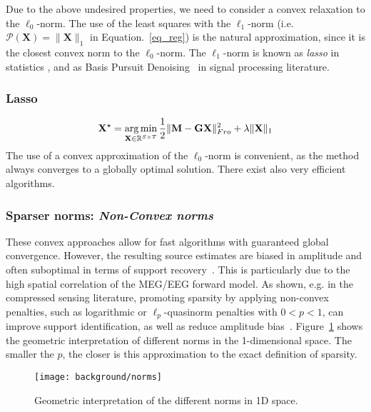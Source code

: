 Due to the above undesired properties, we need to consider a convex relaxation to the $\ell_0$-norm. The use of the least squares with the $\ell_1$-norm (i.e. $\mathcal{P}(\mathbf{X})=\|\mathbf{X}\|_1$ in Equation.~\eqref{eq_reg}) is the natural approximation, since it is the closest convex norm to the $\ell_0$-norm. The $\ell_1$-norm is known as \textit{lasso} in statistics \cite{tibshirani1996regression}, and as Basis Pursuit Denoising~\cite{chen2001atomic} in signal processing literature.

\adjustwidth{1em}{0pt}
\subsubsection*{Lasso}
\begin{equation} \label{eq_lasso}
	\mathbf{X}^\star = \mathop{\mathrm{arg}\,\mathrm{min}}_{\mathbf{X}\in\mathbb{R}^{S\times T}}\frac{1}{2}\|\mathbf{M}-\mathbf{GX}\|_{Fro}^2 + \lambda\|\mathbf{X}\|_1
\end{equation}
\endadjustwidth
The use of a convex approximation of the $\ell_0$-norm is convenient, as the method always converges to a globally optimal solution. There exist also very efficient algorithms.

\subsubsection*{Sparser norms: \textit{Non-Convex norms}}
These convex approaches allow for fast algorithms with guaranteed global convergence. However, the resulting source estimates are biased in amplitude and often suboptimal in terms of support recovery~\cite{candes2008enhancing}. This is particularly due to the high spatial correlation of the MEG/EEG forward model. As shown, e.g. in the compressed sensing literature, promoting sparsity by applying non-convex penalties, such as logarithmic or $\ell_p$-quasinorm penalties with $0 < p < 1$, can improve support identification, as well as reduce amplitude bias~\cite{candes2008enhancing,chartrand2007exact,saab2008stable}. Figure~\ref{fig:norms} shows the geometric interpretation of different norms in the 1-dimensional space. The smaller the $p$, the closer is this approximation to the exact definition of sparsity. 

\begin{figure}
\centering
	\texttt{[image: background/norms]}
    \caption{Geometric interpretation of the different norms in 1D space.}
	\label{fig:norms}
\end{figure}

